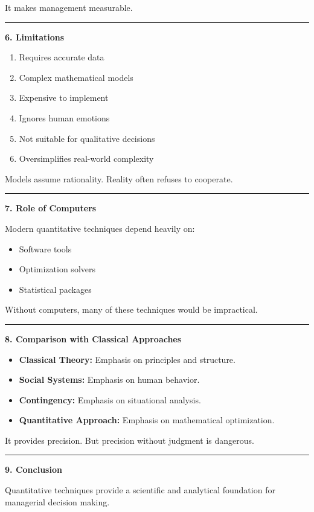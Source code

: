\documentclass[10pt,a4paper]{article}
\newcommand{\separator}{\vspace{0.4em}\noindent\rule{\linewidth}{0.6pt}\vspace{0.4em}}
\begin{document}
It makes management measurable.

\separator

\textbf{6. Limitations}

\begin{enumerate}
  \item Requires accurate data
  \item Complex mathematical models
  \item Expensive to implement
  \item Ignores human emotions
  \item Not suitable for qualitative decisions
  \item Oversimplifies real-world complexity
\end{enumerate}

Models assume rationality.
Reality often refuses to cooperate.

\separator

\textbf{7. Role of Computers}

Modern quantitative techniques depend heavily on:
\begin{itemize}
  \item Software tools
  \item Optimization solvers
  \item Statistical packages
\end{itemize}

Without computers, many of these techniques would be impractical.

\separator

\textbf{8. Comparison with Classical Approaches}

\begin{itemize}
  \item \textbf{Classical Theory:} Emphasis on principles and structure.
  \item \textbf{Social Systems:} Emphasis on human behavior.
  \item \textbf{Contingency:} Emphasis on situational analysis.
  \item \textbf{Quantitative Approach:} Emphasis on mathematical optimization.
\end{itemize}

It provides precision.
But precision without judgment is dangerous.

\separator

\textbf{9. Conclusion}

Quantitative techniques provide a scientific and analytical foundation for managerial decision
making.
\end{document}
